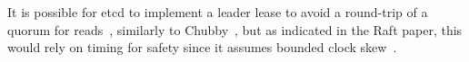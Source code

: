 \documentclass[12pt,conference]{IEEEtran}
\begin{document}
It is possible for etcd to implement a leader lease to avoid a round-trip of a quorum for reads~\cite{gray1989leases}, similarly to Chubby~\cite{burrows2006chubby}, but as indicated in the Raft paper, this would rely on timing for safety since it assumes bounded clock skew~\cite{ongaro2014search}.




%
%



%
%
\end{document}
